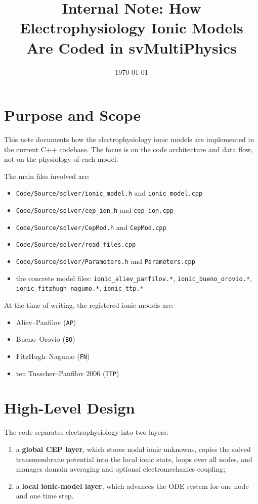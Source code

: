 \documentclass[11pt]{article}
\title{Internal Note: How Electrophysiology Ionic Models Are Coded in svMultiPhysics}
\author{}
\date{\today}
\begin{document}
\maketitle

\section{Purpose and Scope}

This note documents how the electrophysiology ionic models are implemented in the current C++ codebase. The focus is on the code architecture and data flow, not on the physiology of each model.

The main files involved are:
\begin{itemize}[leftmargin=*]
\item \texttt{Code/Source/solver/ionic\_model.h} and \texttt{ionic\_model.cpp}
\item \texttt{Code/Source/solver/cep\_ion.h} and \texttt{cep\_ion.cpp}
\item \texttt{Code/Source/solver/CepMod.h} and \texttt{CepMod.cpp}
\item \texttt{Code/Source/solver/read\_files.cpp}
\item \texttt{Code/Source/solver/Parameters.h} and \texttt{Parameters.cpp}
\item the concrete model files:
  \texttt{ionic\_aliev\_panfilov.*},
  \texttt{ionic\_bueno\_orovio.*},
  \texttt{ionic\_fitzhugh\_nagumo.*},
  \texttt{ionic\_ttp.*}
\end{itemize}

At the time of writing, the registered ionic models are:
\begin{itemize}[leftmargin=*]
\item Aliev--Panfilov (\texttt{AP})
\item Bueno--Orovio (\texttt{BO})
\item FitzHugh--Nagumo (\texttt{FN})
\item ten Tusscher--Panfilov 2006 (\texttt{TTP})
\end{itemize}

\section{High-Level Design}

The code separates electrophysiology into two layers:
\begin{enumerate}[leftmargin=*]
\item a \textbf{global CEP layer}, which stores nodal ionic unknowns, copies the solved transmembrane potential into the local ionic state, loops over all nodes, and manages domain averaging and optional electromechanics coupling;
\item a \textbf{local ionic-model layer}, which advances the ODE system for one node and one time step.
\end{enumerate}
\end{document}
